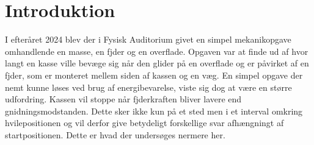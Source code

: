 \chapter{Introduktion}
I efteråret 2024 blev der i Fysisk Auditorium givet en simpel mekanikopgave
omhandlende en masse, en fjder og en overflade. Opgaven var at finde ud af hvor
langt en kasse ville bevæge sig når den glider på en overflade og er påvirket af en fjder, 
som er monteret mellem siden af kassen og en væg. En simpel opgave der nemt kunne løses 
ved brug af energibevarelse, viste sig dog at være en større udfordring. Kassen vil stoppe 
når fjderkraften bliver lavere end gnidningsmodstanden. Dette sker ikke kun på et sted men
i et interval omkring hvilepositionen og vil derfor give betydeligt forskellige svar 
afhængningt af startpositionen. Dette er hvad der undersøges nermere her.
